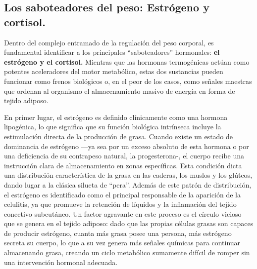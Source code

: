 \documentclass[
  spanish,
]{article}
\begin{document}
\subsection{Los saboteadores del peso: Estrógeno y cortisol.}\label{los-saboteadores-del-peso-estruxf3geno-y-cortisol.}

Dentro del complejo entramado de la regulación del peso corporal, es fundamental identificar a los principales ``saboteadores'' hormonales: \textbf{el estrógeno y el cortisol.} Mientras que las hormonas termogénicas actúan como potentes aceleradores del motor metabólico, estas dos sustancias pueden funcionar como frenos biológicos o, en el peor de los casos, como señales maestras que ordenan al organismo el almacenamiento masivo de energía en forma de tejido adiposo.

En primer lugar, el estrógeno es definido clínicamente como una hormona lipogénica, lo que significa que su función biológica intrínseca incluye la estimulación directa de la producción de grasa. Cuando existe un estado de dominancia de estrógeno ---ya sea por un exceso absoluto de esta hormona o por una deficiencia de su contrapeso natural, la progesterona-, el cuerpo recibe una instrucción clara de almacenamiento en zonas específicas. Esta condición dicta una distribución característica de la grasa en las caderas, los muslos y los glúteos, dando lugar a la clásica silueta de ``pera''. Además de este patrón de distribución, el estrógeno es identificado como el principal responsable de la aparición de la celulitis, ya que promueve la retención de líquidos y la inflamación del tejido conectivo subcutáneo. Un factor agravante en este proceso es el círculo vicioso que se genera en el tejido adiposo: dado que las propias células grasas son capaces de producir estrógeno, cuanta más grasa posee una persona, más estrógeno secreta su cuerpo, lo que a su vez genera más señales químicas para continuar almacenando grasa, creando un ciclo metabólico sumamente difícil de romper sin una intervención hormonal adecuada.
\end{document}
